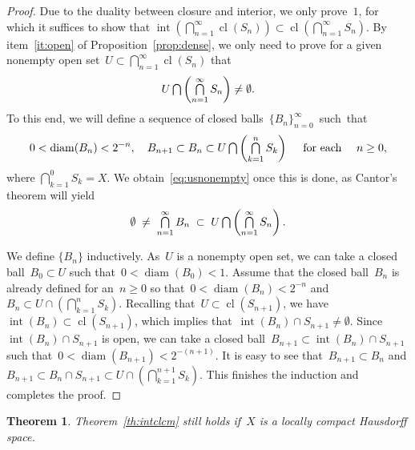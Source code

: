 \documentclass[11pt,a4paper]{article}
\newtheorem{theorem}{Theorem}[section]
\theoremstyle{definition}
\DeclareMathOperator*{\mcap}{\mathsmaller{\bigcap}}
\newcommand{\diam}{\operatorname{diam}}
\DeclareMathOperator{\inter}{int}
\DeclareMathOperator{\cl}{cl}
\numberwithin{equation}{section}
\begin{document}
\begin{proof}
  Due to the duality between closure and interior, we only prove~$1$, for which it suffices to show that 
  $\inter(\bigcap_{n=1}^\infty \cl(S_n))\subset \cl(\bigcap_{n=1}^\infty S_n)$.
  By item~\ref{it:open} of Proposition~\ref{prop:dense}, we only need to prove for a given
  nonempty open set~$U \subset \bigcap_{n=1}^\infty \cl(S_n)$ that%
  \begin{equation}
    \label{eq:usnonempty}
    U\mcap\left(\mcap_{n=1}^\infty S_n\right) \neq \emptyset. 
  \end{equation}
  To this end, we will define a sequence of closed balls~$\{B_n\}_{n=0}^\infty$~such~that%
  \begin{equation}
    \label{eq:nest}
  0< \diam(B_n)< 2^{-n},
  \quad 
  B_{n+1} \subset B_{n} \subset  U\mcap\left(\mcap_{k=1}^n S_k\right)
  \quad \text{ for each } \quad  n \ge 0, 
  \end{equation}
  where $\bigcap_{k=1}^0 S_k=X$. 
  We obtain~\eqref{eq:usnonempty} once this is done, as
  Cantor's theorem will yield
    \begin{equation}
      \label{eq:nestnonempty}
      \emptyset \;\neq \;\mcap_{n=1}^\infty B_n \;\subset\; U\mcap \left(\mcap_{n=1}^\infty
      S_n\right).
    \end{equation}

    We define $\{B_n\}$ inductively. 
    As~$U$ is a nonempty open set, we can take a closed ball~$B_0\subset U$ 
    such that~$0<\diam(B_0)< 1$.
    Assume that the closed ball~$B_n$ is already defined for an~$n\ge 0$ 
    so that~$0<\diam(B_n)< 2^{-n}$ and~$B_n\subset U\cap(\bigcap_{k=1}^n S_k)$.
    Recalling that~$U\subset\cl(S_{n+1})$, 
    we have~$\inter(B_n)\subset \cl(S_{n+1})$, which implies that~$\inter(B_n) \cap S_{n+1} \neq
    \emptyset$. Since~$\inter(B_n)\cap S_{n+1}$ is open, we  
    can take a closed ball~$B_{n+1}\subset \inter(B_n)\cap S_{n+1}$ such that~$0<\diam(B_{n+1})< 2^{-(n+1)}$.  
    It is easy to see that~$B_{n+1}\subset B_n$ and 
    $B_{n+1}\subset B_{n}\cap S_{n+1} \subset U\cap(\bigcap_{k=1}^{n+1} S_k)$. 
     This finishes the induction and completes the proof.
\end{proof}

\begin{theorem}
  \label{th:intcllch} Theorem~\ref{th:intclcm} still holds if~$X$ is a locally compact Hausdorff
  space. 
\end{theorem}
\end{document}
